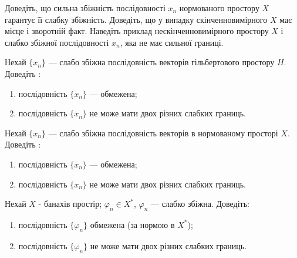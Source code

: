 \begin{exercise}
    Доведіть, що сильна збіжність послідовності $x_n$ нормованого простору $X$ гарантує 
    її слабку збіжність. Доведіть, що у випадку скінченновимірного $X$ має місце і зворотній 
    факт. Наведіть приклад нескінченновимірного простору $X$ і слабко збіжної послідовності 
    $x_n$, яка не має сильної границі.
\end{exercise}

\begin{exercise}
    Нехай $\{x_n\}$ --- слабо збіжна послідовність векторів гільбертового простору $H$. 
    Доведіть : 
    \begin{enumerate}[label=\ukr*)]
        \item послідовність $\{x_n\}$ --- обмежена;
        \item послідовність $\{x_n\}$ не може мати двох різних слабких 
        границь.
    \end{enumerate}
\end{exercise}

\begin{exercise}
    Нехай $\{x_n\}$ --- слабо збіжна послідовність векторів в нормованому 
    просторі $X$. Доведіть :
    \begin{enumerate}[label=\ukr*)]
        \item послідовність $\{x_n\}$ --- обмежена;
        \item послідовність $\{x_n\}$ не може мати двох різних 
        слабких границь.
    \end{enumerate}
\end{exercise}

\begin{exercise}
    Нехай $X$ - банахів простір; $\varphi_n \in X^*$, $\varphi_n$ --- 
    слабко збіжна. Доведіть:
    \begin{enumerate}[label=\ukr*)]
        \item послідовність $\{\varphi_n\}$ обмежена (за нормою в $X^*$);
        \item послідовність $\{\varphi_n\}$ не може мати двох різних слабких 
        границь.
    \end{enumerate}
\end{exercise}

